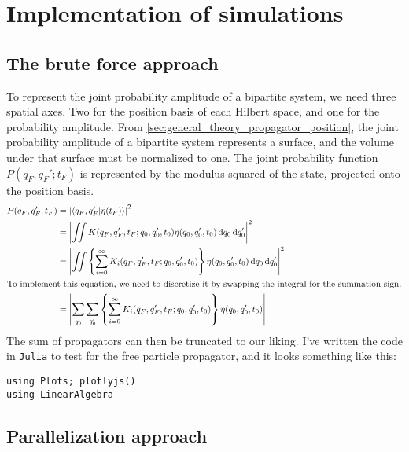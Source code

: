 \chapter{Implementation of simulations}
\label{sec:implementation_of_simulation}

\section{The brute force approach}

To represent the joint probability amplitude of a bipartite system, we need three spatial axes. Two for the position basis of each Hilbert space, and one for the probability amplitude. From \cref{sec:general_theory_propagator_position}, the joint probability amplitude of a bipartite system represents a surface, and the volume under that surface must be normalized to one. The joint probability function $P(q_F, q_F'; t_F)$ is represented by the modulus squared of the state, projected onto the position basis.
\begin{align}
    P(q_F, q_F'; t_F) &= \left|\braket{q_F, q_F'}{\eta(t_F)}\right|^2 \\
    &= \left|\iint K(q_F, q_F', t_F; q_0, q_0', t_0)\eta(q_0, q_0', t_0)\dd{q_0}\dd{q_0'}\right|^2 \\
    &= \left|\iint \left\{\sum_{i = 0}^{\infty}K_i(q_F, q_F', t_F; q_0, q_0', t_0)\right\}\eta(q_0, q_0', t_0)\dd{q_0}\dd{q_0'}\right|^2 \\
    \intertext{To implement this equation, we need to discretize it by swapping the integral for the summation sign.}
    &= \left|\sum_{\vphantom{q_0'}q_0}\sum_{q_0'}\left\{\sum_{\vphantom{q_0'}i = 0}^{\infty}K_i(q_F, q_F', t_F; q_0, q_0', t_0)\right\}\eta(q_0, q_0', t_0)\right|
\end{align}
The sum of propagators can then be truncated to our liking. I've written the code in \texttt{Julia} to test for the free particle propagator, and it looks something like this:
\begin{verbatim}
using Plots; plotlyjs()
using LinearAlgebra
\end{verbatim}

\section{Parallelization approach}
